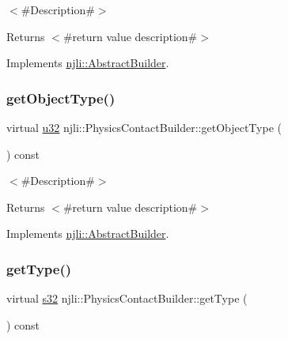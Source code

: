 $<$\#\+Description\#$>$

\begin{DoxyReturn}{Returns}
$<$\#return value description\#$>$ 
\end{DoxyReturn}


Implements \mbox{\hyperlink{classnjli_1_1_abstract_builder_a902f73ea78031b06aca183a417f3413b}{njli\+::\+Abstract\+Builder}}.

\mbox{\label{classnjli_1_1_physics_contact_builder_ae4ba56df76f28087e4824bb1d8eec50a}} 
\subsubsection{\texorpdfstring{get\+Object\+Type()}{getObjectType()}}
{\footnotesize\ttfamily virtual \mbox{\hyperlink{_util_8h_a10e94b422ef0c20dcdec20d31a1f5049}{u32}} njli\+::\+Physics\+Contact\+Builder\+::get\+Object\+Type (\begin{DoxyParamCaption}{ }\end{DoxyParamCaption}) const\hspace{0.3cm}{\ttfamily [virtual]}}

$<$\#\+Description\#$>$

\begin{DoxyReturn}{Returns}
$<$\#return value description\#$>$ 
\end{DoxyReturn}


Implements \mbox{\hyperlink{classnjli_1_1_abstract_builder_a0f2d344fcf697b167f4f2b1122b5fb33}{njli\+::\+Abstract\+Builder}}.

\mbox{\label{classnjli_1_1_physics_contact_builder_a25ba4b5be88ca246e8d117d955fb1fd7}} 
\subsubsection{\texorpdfstring{get\+Type()}{getType()}}
{\footnotesize\ttfamily virtual \mbox{\hyperlink{_util_8h_aa62c75d314a0d1f37f79c4b73b2292e2}{s32}} njli\+::\+Physics\+Contact\+Builder\+::get\+Type (\begin{DoxyParamCaption}{ }\end{DoxyParamCaption}) const\hspace{0.3cm}{\ttfamily [virtual]}}

